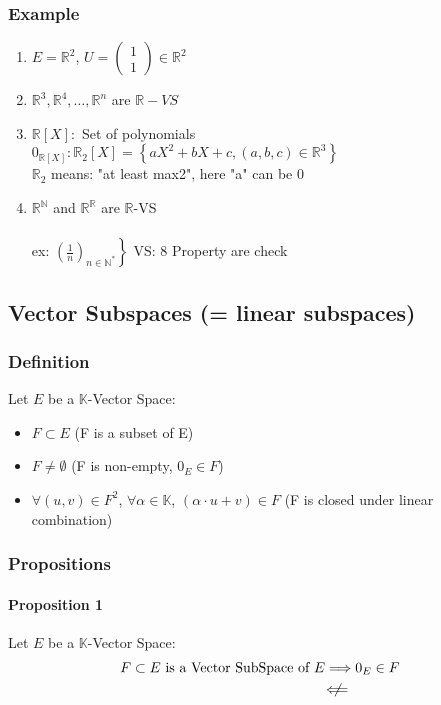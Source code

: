 \documentclass[notitlepage]{math}
\begin{document}
\subsubsection{Example}
\begin{enumerate}
    \item $E = \mathbb{R}^2$, $U = \begin{pmatrix} 1 \\ 1 \end{pmatrix} \in \mathbb{R}^2$
    \item $\mathbb{R}^3 , \mathbb{R}^4, \dots , \mathbb{R}^n$ are $\mathbb{R}-VS$
    \item $\mathbb{R}[X]:$ Set of polynomials \\
    $0_{\mathbb{R}[X]}: \mathbb{R}_2[X] = \left\{aX^2 + bX + c , (a,b,c) \in \mathbb{R}^3\right\}$\\
    $\mathbb{R}_2$ means: "at least max2", here "a" can be 0
    \item $\mathbb{R}^\mathbb{N}$ and $\mathbb{R}^\mathbb{R}$ are $\mathbb{R}$-VS \\ \\
    ex: $\left.\left(\frac{1}{n}\right)_{n\in\mathbb{N}^\ast}\right\}$ VS: 8 Property are check
\end{enumerate}
\subsection{Vector Subspaces (= linear subspaces)}
\subsubsection{Definition}
Let $E$ be a $\mathbb{K}$-Vector Space:\\
\begin{itemize}
    \item $F \subset E$ {\color{green}(F is a subset of E)}
    \item $F \neq \emptyset$ {\color{green}(F is non-empty, $0_E \in F$)}
    \item $\forall (u, v) \in F^2$, $\forall \alpha \in \mathbb{K}$, $(\alpha \cdot u + v) \in F$ {\color{green}(F is closed under linear combination)}
\end{itemize}
\subsubsection{Propositions}
\paragraph{Proposition 1}
Let $E$ be a $\mathbb{K}$-Vector Space:
\begin{align*}
    F \subset E \text{ is a Vector SubSpace of } E &\Longrightarrow 0_E \in F\\
    &\;\not\!\!\!\Longleftarrow  
\end{align*}
\end{document}
